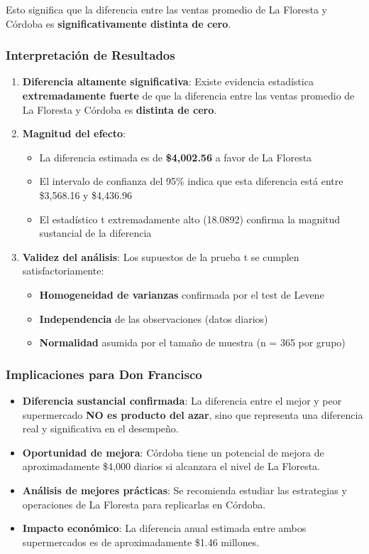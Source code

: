 \documentclass[11pt,a4paper]{article}
\begin{document}
Esto significa que la diferencia entre las ventas promedio de La Floresta y Córdoba es \textbf{significativamente distinta de cero}.

\subsubsection{Interpretación de Resultados}

\begin{enumerate}
    \item \textbf{Diferencia altamente significativa}: Existe evidencia estadística \textbf{extremadamente fuerte} de que la diferencia entre las ventas promedio de La Floresta y Córdoba es \textbf{distinta de cero}.
    
    \item \textbf{Magnitud del efecto}: 
    \begin{itemize}
        \item La diferencia estimada es de \textbf{\$4,002.56} a favor de La Floresta
        \item El intervalo de confianza del 95\% indica que esta diferencia está entre \$3,568.16 y \$4,436.96
        \item El estadístico t extremadamente alto (18.0892) confirma la magnitud sustancial de la diferencia
    \end{itemize}
    
    \item \textbf{Validez del análisis}: Los supuestos de la prueba t se cumplen satisfactoriamente:
    \begin{itemize}
        \item \textbf{Homogeneidad de varianzas} confirmada por el test de Levene
        \item \textbf{Independencia} de las observaciones (datos diarios)
        \item \textbf{Normalidad} asumida por el tamaño de muestra (n = 365 por grupo)
    \end{itemize}
\end{enumerate}

\subsubsection{Implicaciones para Don Francisco}

\begin{itemize}
    \item \textbf{Diferencia sustancial confirmada}: La diferencia entre el mejor y peor supermercado \textbf{NO es producto del azar}, sino que representa una diferencia real y significativa en el desempeño.
    \item \textbf{Oportunidad de mejora}: Córdoba tiene un potencial de mejora de aproximadamente \$4,000 diarios si alcanzara el nivel de La Floresta.
    \item \textbf{Análisis de mejores prácticas}: Se recomienda estudiar las estrategias y operaciones de La Floresta para replicarlas en Córdoba.
    \item \textbf{Impacto económico}: La diferencia anual estimada entre ambos supermercados es de aproximadamente \$1.46 millones.
\end{itemize}
\end{document}
